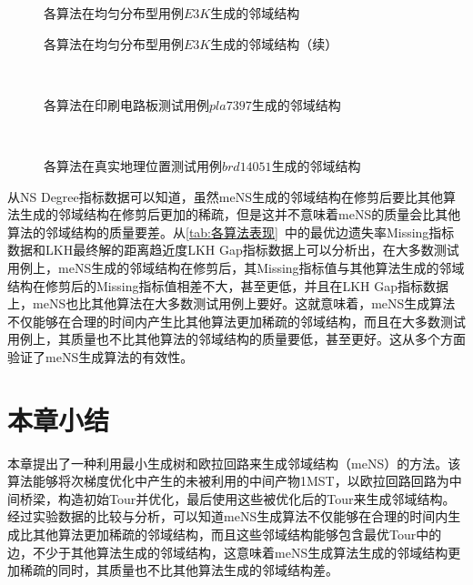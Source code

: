 \begin{figure}[!ht]
     \qquad
    \caption[各算法在均匀分布型用例$E3K$生成的邻域结构]{各算法在均匀分布型用例$E3K$生成的邻域结构}
    \label{fig:各算法在均匀分布型用例E3K生成的邻域结构}
\end{figure}
\begin{figure}[t]
    \ContinuedFloat
     \qquad
    \caption[]{各算法在均匀分布型用例$E3K$生成的邻域结构（续）}
\end{figure}
\begin{figure}[!ht]
     \qquad
     \\
     \qquad
    \caption[各算法在印刷电路板测试用例$pla7397$生成的邻域结构]{各算法在印刷电路板测试用例$pla7397$生成的邻域结构}
    \label{fig:各算法在印刷电路板测试用例pla7397生成的邻域结构}
\end{figure}
\begin{figure}[!ht]
     \qquad
     \\
     \qquad
    \caption[各算法在真实地理位置测试用例$brd14051$生成的邻域结构]{各算法在真实地理位置测试用例$brd14051$生成的邻域结构}
    \label{fig:各算法在真实地理位置测试用例brd14051生成的邻域结构}
\end{figure}
\par
从NS Degree指标数据可以知道，虽然meNS生成的邻域结构在修剪后要比其他算法生成的邻域结构在修剪后更加的稀疏，但是这并不意味着meNS的质量会比其他算法的邻域结构的质量要差。从\autoref{tab:各算法表现}~中的最优边遗失率Missing指标数据和LKH最终解的距离趋近度LKH Gap指标数据上可以分析出，在大多数测试用例上，meNS生成的邻域结构在修剪后，其Missing指标值与其他算法生成的邻域结构在修剪后的Missing指标值相差不大，甚至更低，并且在LKH Gap指标数据上，meNS也比其他算法在大多数测试用例上要好。这就意味着，meNS生成算法不仅能够在合理的时间内产生比其他算法更加稀疏的邻域结构，而且在大多数测试用例上，其质量也不比其他算法的邻域结构的质量要低，甚至更好。这从多个方面验证了meNS生成算法的有效性。

\section{本章小结}
\label{sec:NS_Method:本章小结}
本章提出了一种利用最小生成树和欧拉回路来生成邻域结构（meNS）的方法。该算法能够将次梯度优化中产生的未被利用的中间产物1MST，以欧拉回路回路为中间桥梁，构造初始Tour并优化，最后使用这些被优化后的Tour来生成邻域结构。经过实验数据的比较与分析，可以知道meNS生成算法不仅能够在合理的时间内生成比其他算法更加稀疏的邻域结构，而且这些邻域结构能够包含最优Tour中的边，不少于其他算法生成的邻域结构，这意味着meNS生成算法生成的邻域结构更加稀疏的同时，其质量也不比其他算法生成的邻域结构差。
